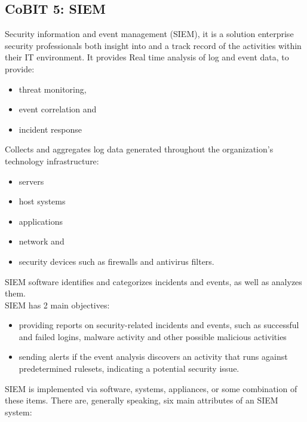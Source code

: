 \documentclass[a4]{article}
\begin{document}
\begin{multicols}{3}
\subsection{CoBIT 5: SIEM}
Security information and event management (SIEM), it is a solution enterprise security professionals both insight into
and a track record of the activities within their IT environment. It provides Real time analysis of log and event data,
to provide: 
\begin{itemize}
    \item threat monitoring,
    \item event correlation and
    \item incident response
\end{itemize}
\noindent
Collects and aggregates log data generated throughout the
organization’s technology infrastructure:
\begin{itemize}
    \item servers
    \item host systems
    \item applications
    \item network and
    \item security devices such as firewalls and antivirus filters.
\end{itemize}
\noindent
SIEM software identifies and categorizes incidents and events, as well as analyzes them. \\
SIEM has 2 main objectives:
\begin{itemize}
    \item providing reports on security-related incidents and events,
    such as successful and failed logins, malware activity and
    other possible malicious activities
    \item sending alerts if the event analysis discovers an activity that
    runs against predetermined rulesets, indicating a potential
    security issue.
\end{itemize}
\noindent
SIEM is implemented via software, systems, appliances, or some combination of these items. 
There are, generally speaking, six main attributes of an SIEM system:


\end{multicols}
\end{document}
